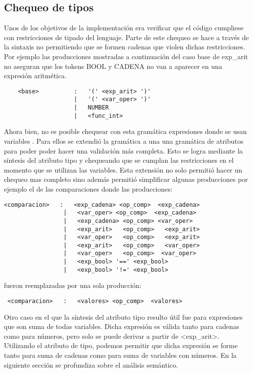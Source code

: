 \subsection{Chequeo de tipos}

Unos de los objetivos de la implementación era verificar que el código cumpliese con restricciones de tipado del lenguaje. Parte de este chequeo se hace a través de la sintaxis no permitiendo  que se formen cadenas que violen dichas restricciones. 
Por ejemplo las producciones mostradas a continuación del caso  base de exp\_arit no aseguran que los tokens BOOL y CADENA no van a aparecer en una expresión aritmética. 
\begin{verbatim}
    <base>          :   '(' <exp_arit> ')'
                    |   '(' <var_oper> ')'
                    |   NUMBER
                    |   <func_int>

\end{verbatim}
	Ahora bien, no es posible chequear con esta gramática expresiones donde se usan variables . Para ellos se extendió la gramática a una una gramática de atributos para poder poder hacer una validación más completa. Esto se logra mediante la síntesis del atributo tipo y chequeando que se cumplan las restricciones en el momento que se utilizan las variables. Esta extensión no solo permitió hacer un chequeo mas completo sino además permitió simplificar algunas producciones por ejemplo el de las comparaciones donde las producciones:
    
\begin{verbatim}
<comparacion>   :   <exp_cadena> <op_comp>  <exp_cadena>
                 |   <var_oper> <op_comp>  <exp_cadena>
                 |   <exp_cadena> <op_comp> <var_oper> 
                 |   <exp_arit>   <op_comp>   <exp_arit>
                 |   <var_oper>   <op_comp>   <exp_arit>
                 |   <exp_arit>   <op_comp>   <var_oper>
                 |   <var_oper>   <op_comp>  <var_oper>
                 |   <exp_bool> '==' <exp_bool>
                 |   <exp_bool> '!=' <exp_bool>
\end{verbatim}
fueron reemplazadas por una sola producción:
\begin{verbatim}
 <comparacion>   :   <valores> <op_comp>  <valores>
\end{verbatim}
 
Otro caso en el que la síntesis del atributo tipo resulto útil fue para expresiones que son suma de todas variables. Dicha expresión es válida tanto para cadenas como para números, pero solo se puede derivar a partir de <exp\_arit>. Utilizando el atributo de tipo, podemos permitir que dicha expresión se forme tanto para suma de cadenas como para suma de variables con números.
    En la siguiente sección se profundiza sobre el análisis semántico.



